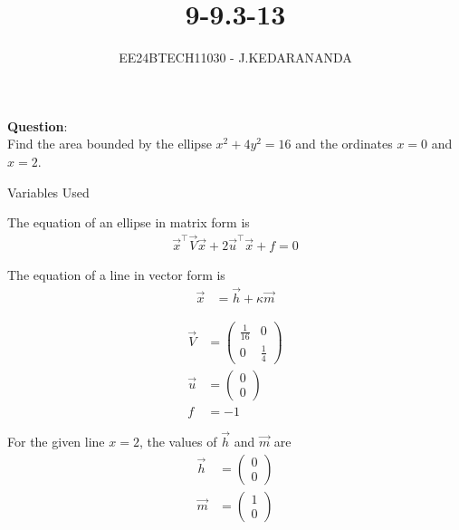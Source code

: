 \documentclass[journal]{IEEEtran}
\numberwithin{equation}{enumi}
\numberwithin{figure}{enumi}
\begin{document}

\title{9-9.3-13}
\author{EE24BTECH11030 - J.KEDARANANDA}
{\let\newpage\relax\maketitle}

\textbf{Question}:\\
Find the area bounded by the ellipse \(x^2 + 4y^2 = 16\) and the ordinates \(x = 0\) and \(x = 2\).

\solution

\begin{table}[h!]    
  \centering
  
  \caption{Variables Used}
  \label{tab1-1.9-6}
\end{table}

The equation of an ellipse in matrix form is
\begin{align}
\vec{x}^\top \vec{V} \vec{x} + 2 \vec{u}^\top \vec{x} + f = 0
\end{align}

The equation of a line in vector form is
\begin{align}
\vec{x} &= \vec{h} + \kappa \vec{m}
\end{align}

\begin{align}
\vec{V} &= \begin{pmatrix} \frac{1}{16} & 0 \\ 0 & \frac{1}{4} \end{pmatrix} \\
\vec{u} &= \begin{pmatrix} 0 \\ 0 \end{pmatrix} \\
f &= -1
\end{align}

For the given line \(x = 2\), the values of \(\vec{h}\) and \(\vec{m}\) are
\begin{align}
\vec{h} &= \begin{pmatrix} 0 \\ 0 \end{pmatrix} \\
\vec{m} &= \begin{pmatrix} 1 \\ 0 \end{pmatrix}
\end{align}
\end{document}
